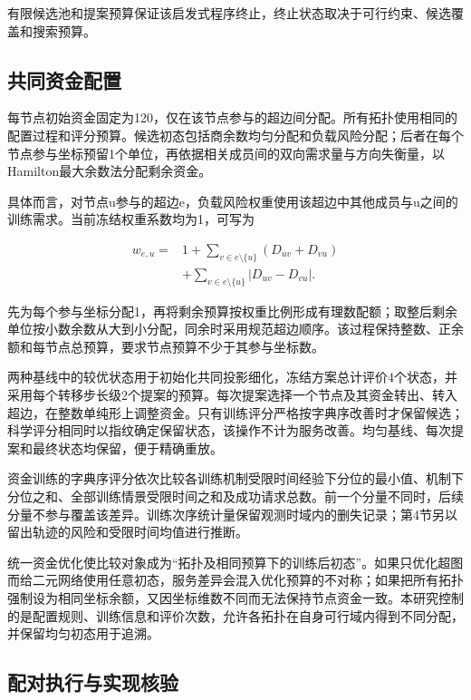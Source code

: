 \documentclass[UTF8,a4paper,twocolumn,fontset=none,zihao=5]{ctexart}
\begin{document}
有限候选池和提案预算保证该启发式程序终止，终止状态取决于可行约束、候选覆盖和搜索预算。


\subsection{共同资金配置}

每节点初始资金固定为120，仅在该节点参与的超边间分配。所有拓扑使用相同的配置过程和评分预算。候选初态包括商余数均匀分配和负载风险分配；后者在每个节点参与坐标预留1个单位，再依据相关成员间的双向需求量与方向失衡量，以Hamilton最大余数法分配剩余资金。


具体而言，对节点u参与的超边e，负载风险权重使用该超边中其他成员与u之间的训练需求。当前冻结权重系数均为1，可写为



\begin{equation}
\begin{aligned}w_{e,u}={}&1+\sum_{v\in e\setminus\{u\}}(D_{uv}+D_{vu})\\&+\sum_{v\in e\setminus\{u\}}|D_{uv}-D_{vu}|.\end{aligned}
\label{eq:12}\end{equation}


先为每个参与坐标分配1，再将剩余预算按权重比例形成有理数配额；取整后剩余单位按小数余数从大到小分配，同余时采用规范超边顺序。该过程保持整数、正余额和每节点总预算，要求节点预算不少于其参与坐标数。


两种基线中的较优状态用于初始化共同投影细化，冻结方案总计评价4个状态，并采用每个转移步长级2个提案的预算。每次提案选择一个节点及其资金转出、转入超边，在整数单纯形上调整资金。只有训练评分严格按字典序改善时才保留候选；科学评分相同时以指纹确定保留状态，该操作不计为服务改善。均匀基线、每次提案和最终状态均保留，便于精确重放。


资金训练的字典序评分依次比较各训练机制受限时间经验下分位的最小值、机制下分位之和、全部训练情景受限时间之和及成功请求总数。前一个分量不同时，后续分量不参与覆盖该差异。训练次序统计量保留观测时域内的删失记录；第4节另以留出轨迹的风险和受限时间均值进行推断。


统一资金优化使比较对象成为“拓扑及相同预算下的训练后初态”。如果只优化超图而给二元网络使用任意初态，服务差异会混入优化预算的不对称；如果把所有拓扑强制设为相同坐标余额，又因坐标维数不同而无法保持节点资金一致。本研究控制的是配置规则、训练信息和评价次数，允许各拓扑在自身可行域内得到不同分配，并保留均匀初态用于追溯。


\subsection{配对执行与实现核验}
\end{document}

